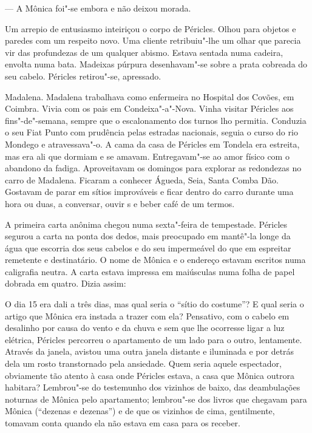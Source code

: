 --- A Mônica foi"-se embora e não deixou morada.


Um arrepio de entusiasmo inteiriçou o corpo de Péricles. Olhou para
objetos e paredes com um respeito novo. Uma cliente retribuiu"-lhe um
olhar que parecia vir das profundezas de um qualquer abismo. Estava
sentada numa cadeira, envolta numa bata. Madeixas púrpura desenhavam"-se
sobre a prata cobreada do seu cabelo. Péricles retirou"-se, apressado.

Madalena. Madalena trabalhava como enfermeira no Hospital dos Covões, em
Coimbra. Vivia com os pais em Condeixa"-a"-Nova. Vinha visitar Péricles
aos fins"-de"-semana, sempre que o escalonamento dos turnos lho permitia.
Conduzia o seu Fiat Punto com prudência pelas estradas nacionais,
seguia o curso do rio Mondego e atravessava"-o. A cama da casa de
Péricles em Tondela era estreita, mas era ali que dormiam e
se amavam. Entregavam"-se ao amor físico com o abandono da fadiga.
Aproveitavam os domingos para explorar as redondezas no carro de
Madalena. Ficaram a conhecer Águeda, Seia, Santa Comba Dão. Gostavam de
parar em sítios improváveis e ficar dentro do carro durante uma hora ou
duas, a conversar, ouvir s e beber café de um termos.

A primeira carta anônima chegou numa sexta"-feira de tempestade. Péricles
segurou a carta na ponta dos dedos, mais preocupado em mantê"-la longe da
água que escorria dos seus cabelos e do seu impermeável do que em
espreitar remetente e destinatário. O nome de Mônica e o endereço
estavam escritos numa caligrafia neutra. A carta estava impressa em
maiúsculas numa folha de papel dobrada em quatro. Dizia assim:

\begin{quotation}
\end{quotation}

O dia 15 era dali a três dias, mas qual seria o ``sítio do costume''?
E qual seria o artigo que Mônica era instada a trazer com ela?
Pensativo, com o cabelo em desalinho por causa do
vento e da chuva e sem que lhe ocorresse ligar a luz elétrica, Péricles
percorreu o apartamento de um lado para o outro, lentamente. Através da
janela, avistou uma outra janela distante e iluminada e por detrás
dela um rosto transtornado pela ansiedade. Quem seria aquele espectador,
obviamente tão atento à casa onde Péricles estava, a casa que Mônica
outrora habitara? Lembrou"-se do testemunho dos vizinhos de baixo, das
deambulações noturnas de Mônica pelo apartamento; lembrou"-se dos livros
que chegavam para Mônica (``dezenas e dezenas'') e de que os vizinhos de
cima, gentilmente, tomavam conta quando ela não estava em casa para os
receber.

